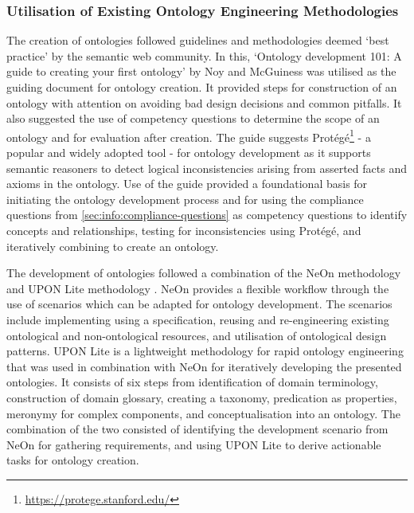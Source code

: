 \subsubsection*{Utilisation of Existing Ontology Engineering Methodologies}
The creation of ontologies followed guidelines and methodologies deemed `best practice' by the semantic web community. In this, `Ontology development 101: A guide to creating your first ontology' by Noy and McGuiness \cite{noy_ontology_2001} was utilised as the guiding document for ontology creation. It provided steps for construction of an ontology with attention on avoiding bad design decisions and common pitfalls. It also suggested the use of competency questions to determine the scope of an ontology and for evaluation after creation.
The guide suggests Protégé\footnote{\url{https://protege.stanford.edu/}} - a popular and widely adopted tool - for ontology development as it supports semantic reasoners to detect logical inconsistencies arising from asserted facts and axioms in the ontology.
Use of the guide provided a foundational basis for initiating the ontology development process and for using the compliance questions from \autoref{sec:info:compliance-questions} as competency questions to identify concepts and relationships, testing for inconsistencies using Protégé, and iteratively combining to create an ontology. 

The development of ontologies followed a combination of the NeOn methodology \cite{suarez-figueroa_neon_2012} and UPON Lite methodology \cite{de_nicola_lightweight_2016}. NeOn provides a flexible workflow through the use of scenarios which can be adapted for ontology development. The scenarios include implementing using a specification, reusing and re-engineering existing ontological and non-ontological resources, and utilisation of ontological design patterns. 
UPON Lite is a lightweight methodology for rapid ontology engineering that was used in combination with NeOn for iteratively developing the presented ontologies. It consists of six steps from identification of domain terminology, construction of domain glossary, creating a taxonomy, predication as properties, meronymy for complex components, and conceptualisation into an ontology.
The combination of the two consisted of identifying the development scenario from NeOn for gathering requirements, and using UPON Lite to derive actionable tasks for ontology creation.


